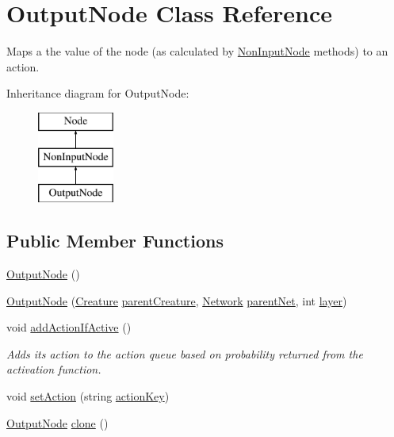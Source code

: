 \hypertarget{class_output_node}{}\section{Output\+Node Class Reference}
\label{class_output_node}


Maps a the value of the node (as calculated by \mbox{\hyperlink{class_non_input_node}{Non\+Input\+Node}} methods) to an action.  


Inheritance diagram for Output\+Node\+:\begin{figure}[H]
\begin{center}
\leavevmode
\includegraphics[height=3.000000cm]{class_output_node}
\end{center}
\end{figure}
\subsection*{Public Member Functions}
\begin{DoxyCompactItemize}
\item 
\mbox{\hyperlink{class_output_node_abf3c6c3ab42fb35f64e894a15f0d057e}{Output\+Node}} ()
\item 
\mbox{\hyperlink{class_output_node_ab065c6d98c883b8416acbc5add709013}{Output\+Node}} (\mbox{\hyperlink{class_creature}{Creature}} \mbox{\hyperlink{class_output_node_a4be36782d750ac8d91c0f51628d353fb}{parent\+Creature}}, \mbox{\hyperlink{class_network}{Network}} \mbox{\hyperlink{class_non_input_node_ac79615aee9a2b85aa9c31f98451da37a}{parent\+Net}}, int \mbox{\hyperlink{class_non_input_node_a5614e202d11fbe3ca55ec88e6e803cb8}{layer}})
\item 
void \mbox{\hyperlink{class_output_node_a6d6a43ded165156d825fd039487f2a10}{add\+Action\+If\+Active}} ()
\begin{DoxyCompactList}\small\item\em Adds its action to the action queue based on probability returned from the activation function. \end{DoxyCompactList}\item 
void \mbox{\hyperlink{class_output_node_aeb94c02a334d514de5a0bcb474778f41}{set\+Action}} (string \mbox{\hyperlink{class_output_node_a48299e62ef82f692d8656d0efec1b236}{action\+Key}})
\item 
\mbox{\hyperlink{class_output_node}{Output\+Node}} \mbox{\hyperlink{class_output_node_af4524058cc5cbb2fbd29aac4b970395f}{clone}} ()
\end{DoxyCompactItemize}
